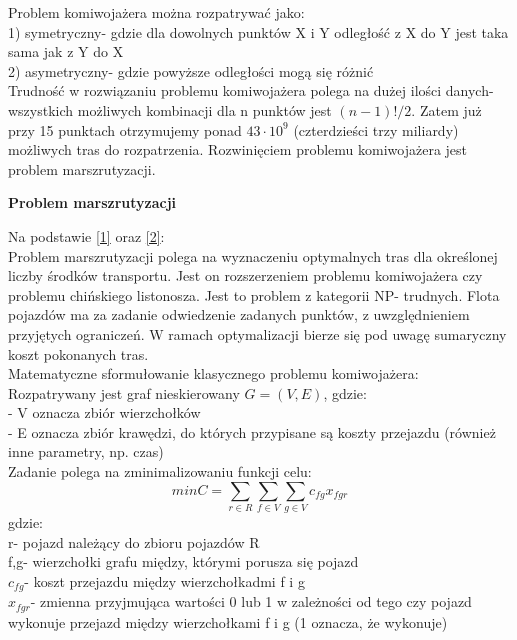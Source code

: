 \documentclass[a4paper, twoside, 12pt, justified]{article}
\begin{document}
	
	
	Problem komiwojażera można rozpatrywać jako:\\
	1) symetryczny- gdzie dla dowolnych punktów X i Y odległość z X do Y jest taka sama jak z Y do X\\
	2) asymetryczny- gdzie powyższe odległości mogą się różnić\\
	
	Trudność w rozwiązaniu problemu komiwojażera polega na dużej ilości danych- wszystkich możliwych kombinacji dla n punktów jest $(n-1)!/2$. Zatem już przy 15 punktach otrzymujemy ponad $43\cdot10^9$ (czterdzieści trzy miliardy) możliwych tras do rozpatrzenia. Rozwinięciem problemu komiwojażera jest problem marszrutyzacji.\newpage
	
	\begin{large}
		\begin{center}
			\textbf{Problem marszrutyzacji}
		\end{center}
	\end{large}

	Na podstawie \hyperlink{vrp}{[1]} oraz \hyperlink{cvrp}{[2]}:\\
	Problem marszrutyzacji polega na wyznaczeniu optymalnych tras dla określonej liczby środków transportu. Jest on rozszerzeniem problemu komiwojażera czy problemu chińskiego listonosza. Jest to problem z kategorii NP- trudnych. Flota pojazdów ma za zadanie odwiedzenie zadanych punktów, z uwzględnieniem przyjętych ograniczeń. W ramach optymalizacji bierze się pod uwagę sumaryczny koszt pokonanych tras. \\
	Matematyczne sformułowanie klasycznego problemu komiwojażera:\\
	Rozpatrywany jest graf nieskierowany $G=(V,E)$, gdzie:\\
	- V oznacza zbiór wierzchołków\\ 
	- E oznacza zbiór krawędzi, do których przypisane są koszty przejazdu (również inne parametry, np. czas)
	\\
	Zadanie polega na zminimalizowaniu funkcji celu:
	\begin{equation}
	{minC=\sum\limits_{r \in R}\sum\limits_{f \in V}\sum\limits_{g \in V}}c_{fg}x_{fgr}
	\end{equation}
	gdzie:\\
	r- pojazd należący do zbioru pojazdów R\\
	f,g- wierzchołki grafu między, którymi porusza się pojazd\\
	$c_{fg}$- koszt przejazdu między wierzchołkadmi f i g\\
	$x_{fgr}$- zmienna przyjmująca wartości 0 lub 1 w zależności od tego czy pojazd wykonuje przejazd między wierzchołkami f i g (1 oznacza, że wykonuje) \\
	
\end{document}
